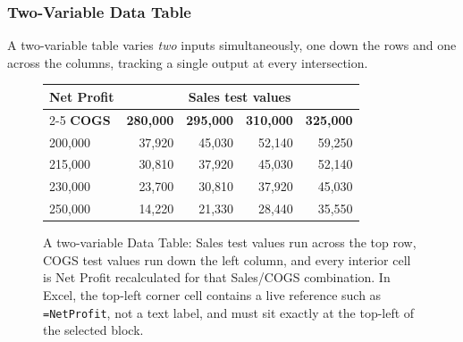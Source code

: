\documentclass[11pt,a4paper]{article}
\begin{document}
\subsubsection{Two-Variable Data Table}

A two-variable table varies \emph{two} inputs simultaneously, one down the rows and one across the columns, tracking a single output at every intersection.

\begin{figure}[h]
\centering
\begin{tcolorbox}[width=0.95\linewidth,colback=white,colframe=rulegray,boxrule=0.5pt,arc=1pt]
\centering\small
\begin{tabular}{@{}lrrrr@{}}
\toprule
\textbf{Net Profit} & \multicolumn{4}{c}{\textbf{Sales test values}} \\
\cmidrule(l){2-5}
\textbf{COGS} & \textbf{280,000} & \textbf{295,000} & \textbf{310,000} & \textbf{325,000} \\
\midrule
200,000 & 37,920 & 45,030 & 52,140 & 59,250 \\
215,000 & 30,810 & 37,920 & 45,030 & 52,140 \\
230,000 & 23,700 & 30,810 & 37,920 & 45,030 \\
250,000 & 14,220 & 21,330 & 28,440 & 35,550 \\
\bottomrule
\end{tabular}
\end{tcolorbox}
\caption{A two-variable Data Table: Sales test values run across the top row, COGS test values run down the left column, and every interior cell is Net Profit recalculated for that Sales/COGS combination. In Excel, the top-left corner cell contains a live reference such as \texttt{=NetProfit}, not a text label, and must sit exactly at the top-left of the selected block.}
\label{fig:datatable2var}
\end{figure}
\end{document}
